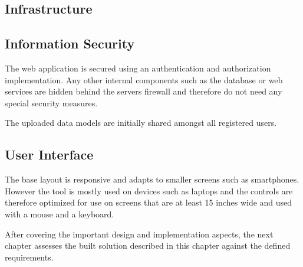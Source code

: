 \subsection{Infrastructure}
\label{subsec:infrastructure}

\subsection{Information Security}

The web application is secured using an authentication and authorization implementation. Any other internal components such as the database or web services are hidden behind the servers firewall and therefore do not need any special security measures.

The uploaded data models are initially shared amongst all registered users.

\subsection{User Interface}

The base layout is responsive and adapts to smaller screens such as smartphones. However the tool is mostly used on devices such as laptops and the controls are therefore optimized for use on screens that are at least 15 inches wide and used with a mouse and a keyboard.


\bigskip
After covering the important design and implementation aspects, the next chapter assesses the built solution described in this chapter against the defined requirements.
